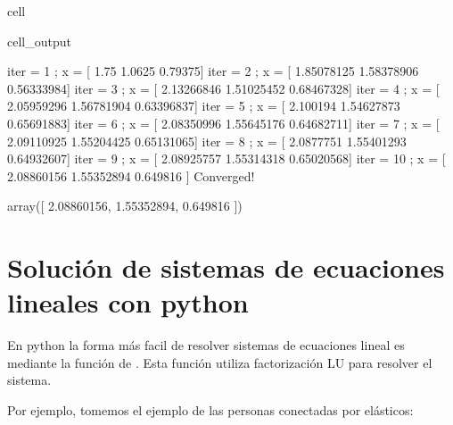 \documentclass[letterpaper,10pt,english]{jupyterBook}
\begin{document}
\begin{sphinxuseclass}{cell}
\begin{sphinxVerbatimOutput}
\begin{sphinxuseclass}{cell_output}
\begin{sphinxVerbatim}[commandchars=\\\{\}]
iter = 1 ; x = [ 1.75    \PYGZhy{}1.0625  \PYGZhy{}0.79375]
iter = 2 ; x = [ 1.85078125 \PYGZhy{}1.58378906 \PYGZhy{}0.56333984]
iter = 3 ; x = [ 2.13266846 \PYGZhy{}1.51025452 \PYGZhy{}0.68467328]
iter = 4 ; x = [ 2.05959296 \PYGZhy{}1.56781904 \PYGZhy{}0.63396837]
iter = 5 ; x = [ 2.100194   \PYGZhy{}1.54627873 \PYGZhy{}0.65691883]
iter = 6 ; x = [ 2.08350996 \PYGZhy{}1.55645176 \PYGZhy{}0.64682711]
iter = 7 ; x = [ 2.09110925 \PYGZhy{}1.55204425 \PYGZhy{}0.65131065]
iter = 8 ; x = [ 2.0877751  \PYGZhy{}1.55401293 \PYGZhy{}0.64932607]
iter = 9 ; x = [ 2.08925757 \PYGZhy{}1.55314318 \PYGZhy{}0.65020568]
iter = 10 ; x = [ 2.08860156 \PYGZhy{}1.55352894 \PYGZhy{}0.649816  ]
Converged!
\end{sphinxVerbatim}

\begin{sphinxVerbatim}[commandchars=\\\{\}]
array([ 2.08860156, \PYGZhy{}1.55352894, \PYGZhy{}0.649816  ])
\end{sphinxVerbatim}

\end{sphinxuseclass}\end{sphinxVerbatimOutput}

\end{sphinxuseclass}

\section{Solución de sistemas de ecuaciones lineales con python}
\label{\detokenize{1.2-Algebra_lineal/1.2-Algebra_lineal:solucion-de-sistemas-de-ecuaciones-lineales-con-python}}
\sphinxAtStartPar
En python la forma más facil de resolver sistemas de ecuaciones lineal es mediante la función  de . Esta función utiliza factorización LU para resolver el sistema.

\sphinxAtStartPar
Por ejemplo, tomemos el ejemplo de las personas conectadas por elásticos:
\end{document}
